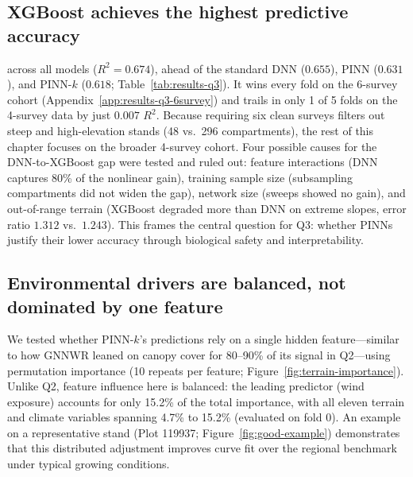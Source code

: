 \documentclass[logo,msc,ai]{infthesis}           %
\begin{document}
\subsection{XGBoost achieves the highest predictive accuracy} across all models ($R^2 = 0.674$), ahead of the standard DNN ($0.655$), PINN ($0.631$), and PINN-$k$ ($0.618$; Table~\ref{tab:results-q3}). It wins every fold on the 6-survey cohort (Appendix~\ref{app:results-q3-6survey}) and trails in only 1 of 5 folds on the 4-survey data by just $0.007$ $R^2$. Because requiring six clean surveys filters out steep and high-elevation stands (48 vs.\ 296 compartments), the rest of this chapter focuses on the broader 4-survey cohort. Four possible causes for the DNN-to-XGBoost gap were tested and ruled out: feature interactions (DNN captures 80\% of the nonlinear gain), training sample size (subsampling compartments did not widen the gap), network size (sweeps showed no gain), and out-of-range terrain (XGBoost degraded more than DNN on extreme slopes, error ratio $1.312$ vs.\ $1.243$). This frames the central question for Q3: whether PINNs justify their lower accuracy through biological safety and interpretability.

\subsection{Environmental drivers are balanced, not dominated by one feature}
We tested whether PINN-$k$'s predictions rely on a single hidden feature—similar to how GNNWR leaned on canopy cover for 80--90\% of its signal in Q2—using permutation importance (10 repeats per feature; Figure~\ref{fig:terrain-importance}). Unlike Q2, feature influence here is balanced: the leading predictor (wind exposure) accounts for only 15.2\% of the total importance, with all eleven terrain and climate variables spanning 4.7\% to 15.2\% (evaluated on fold 0). An example on a representative stand (Plot 119937; Figure~\ref{fig:good-example}) demonstrates that this distributed adjustment improves curve fit over the regional benchmark under typical growing conditions.
\end{document}
